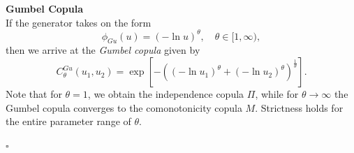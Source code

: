 \textbf{Gumbel Copula}\\
If the generator takes on the form
\begin{equation}
\phi_{G u}(u)=(-\ln u)^{\theta}, \quad \theta \in [1, \infty),
\end{equation}
then we arrive at the \textit{Gumbel copula} given by
\begin{equation}
C_{\theta}^{G u}\left(u_{1}, u_{2}\right)=\exp \left[-\left(\left(-\ln u_{1}\right)^{\theta}+\left(-\ln u_{2}\right)^{\theta}\right)^{\frac{1}{\theta}}\right].
\end{equation}
Note that for $\theta= 1$, we obtain the independence copula $\Pi$, while for $\theta \rightarrow \infty$ the Gumbel copula converges to the comonotonicity copula $M$. Strictness holds for the entire parameter range of $\theta$.

\hfill $\square$ \\






